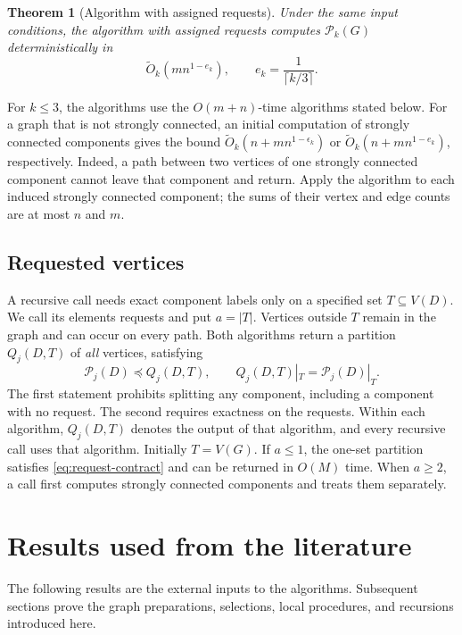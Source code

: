 \documentclass[11pt]{article}
\newtheorem{theorem}{Theorem}[section]
\theoremstyle{definition}
\theoremstyle{remark}
\newcommand{\PP}{\mathcal P}
\newcommand{\OO}{\widetilde O}
\begin{document}
\begin{theorem}[Algorithm with assigned requests]
\label{thm:fast}
Under the same input conditions, the algorithm with assigned requests computes \(\PP_k(G)\) deterministically in
\[
 \OO_k\!\left(mn^{1-e_k}\right),\qquad
 e_k=\frac1{\lceil k/3\rceil}.
\]
\end{theorem}

For \(k\le3\), the algorithms use the \(O(m+n)\)-time algorithms stated below. For a graph that is not strongly connected, an initial computation of strongly connected components gives the bound
\(\OO_k(n+m n^{1-\epsilon_k})\) or
\(\OO_k(n+m n^{1-e_k})\), respectively. Indeed, a path between two vertices of one strongly connected component cannot leave that component and return. Apply the algorithm to each induced strongly connected component; the sums of their vertex and edge counts are at most \(n\) and \(m\).

\subsection{Requested vertices}
\label{sec:requests}
A recursive call needs exact component labels only on a specified set \(T\subseteq V(D)\). We call its elements requests and put \(a=|T|\). Vertices outside \(T\) remain in the graph and can occur on every path. Both algorithms return a partition \(Q_j(D,T)\) of \emph{all} vertices, satisfying
\begin{equation}
 \PP_j(D)\preceq Q_j(D,T),\qquad
 Q_j(D,T)|_T=\PP_j(D)|_T.
 \label{eq:request-contract}
\end{equation}
The first statement prohibits splitting any component, including a component with no request. The second requires exactness on the requests. Within each algorithm, \(Q_j(D,T)\) denotes the output of that algorithm, and every recursive call uses that algorithm. Initially \(T=V(G)\). If \(a\le1\), the one-set partition satisfies \eqref{eq:request-contract} and can be returned in \(O(M)\) time. When \(a\ge2\), a call first computes strongly connected components and treats them separately.

\section{Results used from the literature}
\label{sec:background}
The following results are the external inputs to the algorithms. Subsequent sections prove the graph preparations, selections, local procedures, and recursions introduced here.
\end{document}
